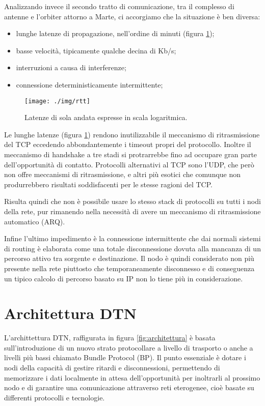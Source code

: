 \documentclass[12pt,a4paper,oneside]{book}
\begin{document}
		Analizzando invece il secondo tratto di comunicazione, tra il complesso di antenne e l'orbiter attorno a Marte, ci accorgiamo che la situazione è ben diversa:
		\begin{itemize}
			\item lunghe latenze di propagazione, nell'ordine di minuti (figura \ref{fig:rtt});
			\item basse velocità, tipicamente qualche decina di Kb/s;
			\item interruzioni a causa di interferenze;
			\item connessione deterministicamente intermittente;
		\end{itemize}
		
		\begin{figure}[h]
			\centering
			\texttt{[image: ./img/rtt]}
			\caption{Latenze di sola andata espresse in scala logaritmica.}
			\label{fig:rtt}
		\end{figure}
		
		Le lunghe latenze (figura \ref{fig:rtt}) rendono inutilizzabile il meccanismo di ritrasmissione del TCP eccedendo abbondantemente i timeout propri del protocollo. Inoltre il meccanismo di handshake a tre stadi si protrarrebbe fino ad occupare gran parte dell'opportunità di contatto. Protocolli alternativi al TCP sono l'UDP, che però non offre meccanismi di ritrasmissione, e altri più esotici che comunque non produrrebbero risultati soddisfacenti per le stesse ragioni del TCP.
		
		Risulta quindi che non è possibile usare lo stesso stack di protocolli su tutti i nodi della rete, pur rimanendo nella necessità di avere un meccanismo di ritrasmissione automatico (ARQ). 

		Infine l'ultimo impedimento è la connessione intermittente che dai normali sistemi di routing è elaborata come una totale disconnessione dovuta alla mancanza di un percorso attivo tra sorgente e destinazione. Il nodo è quindi considerato non più presente nella rete piuttosto che temporaneamente disconnesso e di conseguenza un tipico calcolo di percorso basato su IP non lo tiene più in considerazione.
		
		
		\section{Architettura DTN}		
		
		L'archittettura DTN, raffigurata in figura \ref{fig:architettura} è basata sull'introduzione di un nuovo strato protocollare a livello di trasporto o anche a livelli più bassi chiamato Bundle Protocol (BP). Il punto essenziale è dotare i nodi della capacità di gestire ritardi e disconnessioni, permettendo di memorizzare i dati localmente in attesa dell'opportunità per inoltrarli al prossimo nodo e di garantire una comunicazione attraverso reti eterogenee, cioè basate su differenti protocolli e tecnologie. 
		
\end{document}
